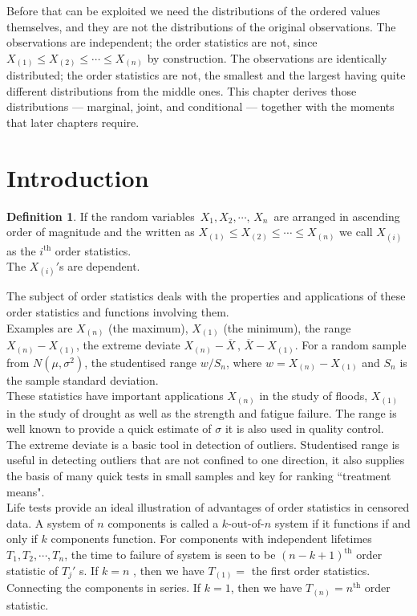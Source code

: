 \documentclass[12pt,a4paper]{report}
\theoremstyle{definition}
\newtheorem{defn}[thm]{Definition}
\theoremstyle{plain}
\begin{document}
Before that can be exploited we need the distributions of the ordered values
themselves, and they are not the distributions of the original observations.
The observations are independent; the order statistics are not, since
$X_{(1)}\leq X_{(2)}\leq\cdots\leq X_{(n)}$ by construction. The observations
are identically distributed; the order statistics are not, the smallest and the
largest having quite different distributions from the middle ones. This chapter
derives those distributions --- marginal, joint, and conditional --- together
with the moments that later chapters require.



\section{Introduction}
\begin{defn}
If the random variables $\, X_1, X_2, \cdots, \, X_n\,$ are arranged in ascending order of magnitude and the written as $X_{(1)} \leq X_{(2)} \leq \cdots\leq X_{(n)}$ we call $X_{(i)}$ as the $i^{\text{th}}$ order statistics.\\ The $X_{(i)}'$s are dependent.
\end{defn}

The subject of order statistics deals with the properties and applications of these order statistics and functions involving them.\\
Examples are $X_{(n)}$ (the maximum), $X_{(1)}$ (the minimum), the range $X_{(n)} - X_{(1)}$, the extreme deviate $X_{(n)} - \overline{X}\, , \, \overline{X} - X_{(1)}$. For a random sample from $N(\mu,\sigma^2)$, the  studentised range $w/S_n$, where $w = X_{(n)} - X_{(1)}$ and $S_n$ is the sample standard deviation.\\
These statistics have important applications $X_{(n)}$ in the study of floods, $X_{(1)}$ in the study of drought as well as the strength and fatigue failure. The range is well known to provide a quick estimate of $\sigma$ it is also used in quality control.\\
The extreme deviate is a basic tool in detection of outliers. Studentised range is useful in detecting outliers that are not confined to one direction, it also supplies the basis of many quick tests in small samples and key for ranking ``treatment means".\\
Life tests provide an ideal illustration of advantages of order statistics in censored data. A system of $n$  components is called a $k$-out-of-$n$ system if it functions if and only if $k$ components function. For components with independent lifetimes $T_1, T_2, \cdots, T_n$, the time to failure of system is seen to be $(n - k + 1)^{\text{th}}$ order statistic of $T_j'$ s. If $k = n$ , then we have $T_{(1)} = $ the first order statistics. Connecting the components in series. If $k = 1$, then we have $T_{(n)} = n^{\text{th}}$ order statistic.\\\\
\end{document}
